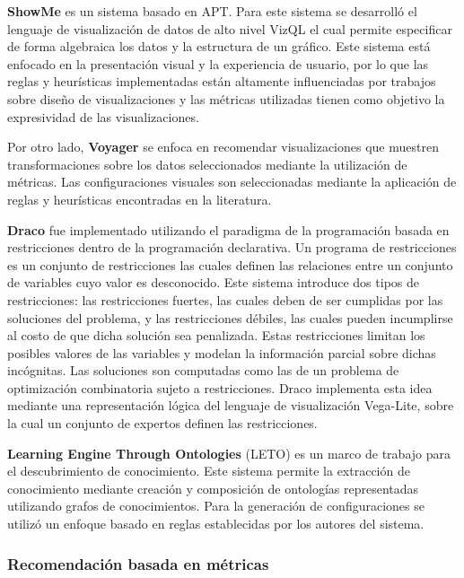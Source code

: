 \textbf{ShowMe} \cite{mackinlay2007show} es un sistema basado en APT. Para
este sistema se desarroll\'o el lenguaje de visualizaci\'on de datos de alto nivel VizQL \cite{hanrahan2006vizql} el cual permite
especificar de forma algebraica los datos y la estructura de un gr\'afico.
Este sistema est\'a enfocado en la presentaci\'on visual y la experiencia de usuario, por lo que las reglas y heur\'isticas implementadas
est\'an altamente influenciadas por trabajos sobre dise\~no de visualizaciones y las m\'etricas utilizadas tienen como objetivo la expresividad de las visualizaciones. 

Por otro lado, \textbf{Voyager} \cite{wongsuphasawat2015voyager} se enfoca en recomendar visualizaciones que muestren transformaciones 
sobre los datos seleccionados mediante
la utilizaci\'on de m\'etricas. Las configuraciones visuales son seleccionadas mediante la aplicaci\'on de reglas y heur\'isticas encontradas en la literatura. 

\textbf{Draco} \cite{saket2018beyond} fue implementado utilizando el paradigma de la programaci\'on
basada en restricciones dentro de la programaci\'on declarativa. Un programa de restricciones 
es un conjunto de restricciones las cuales definen las relaciones entre un conjunto de variables cuyo
valor es desconocido. Este sistema introduce dos tipos de restricciones: las restricciones fuertes, las cuales deben de ser cumplidas por las soluciones del problema, y las restricciones d\'ebiles, las cuales
pueden incumplirse al costo de que dicha soluci\'on sea penalizada. Estas restricciones limitan los posibles
valores de las variables y modelan la informaci\'on parcial sobre dichas inc\'ognitas. Las soluciones son
computadas como las de un problema de optimizaci\'on combinatoria sujeto a restricciones. Draco implementa
esta idea mediante una representaci\'on l\'ogica del lenguaje de visualizaci\'on Vega-Lite, sobre la
cual un conjunto de expertos definen las restricciones.

\textbf{Learning Engine Through Ontologies} (LETO) \cite{estevez2019demo} es un marco de trabajo para el descubrimiento
de conocimiento. Este sistema permite la extracci\'on de conocimiento mediante creaci\'on y composici\'on de ontolog\'ias 
representadas utilizando grafos de conocimientos. Para la generaci\'on de configuraciones
se utiliz\'o un enfoque basado en reglas establecidas por los autores del sistema.

\subsubsection{Recomendaci\'on basada en m\'etricas}

